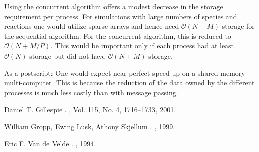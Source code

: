 \documentclass[letterpaper]{article}
\begin{document}
Using the concurrent algorithm offers a modest decrease in the 
storage requirement per process.  For simulations with large 
numbers of species and reactions one would utilize sparse arrays and 
hence need $\mathcal{O}(N + M)$ storage for the sequential algorithm.
For the concurrent algorithm, this is reduced to $\mathcal{O}(N + M / P)$.
This would be important only if each process had at least $\mathcal{O}(N)$ 
storage but did not have $\mathcal{O}(N + M)$ storage.

As a postscript: One would expect near-perfect speed-up on a shared-memory
multi-computer.  This is because the reduction of the data owned by the 
different processes is much less costly than with message passing.




\begin{thebibliography}{10}

Daniel T. Gillespie
. 
, Vol. 115, No. 4, 1716--1733, 2001.

William Gropp, Ewing Lusk, Athony Skjellum
. 
, 1999.

Eric F. Van de Velde
. 
, 1994.

\end{thebibliography}
\end{document}
